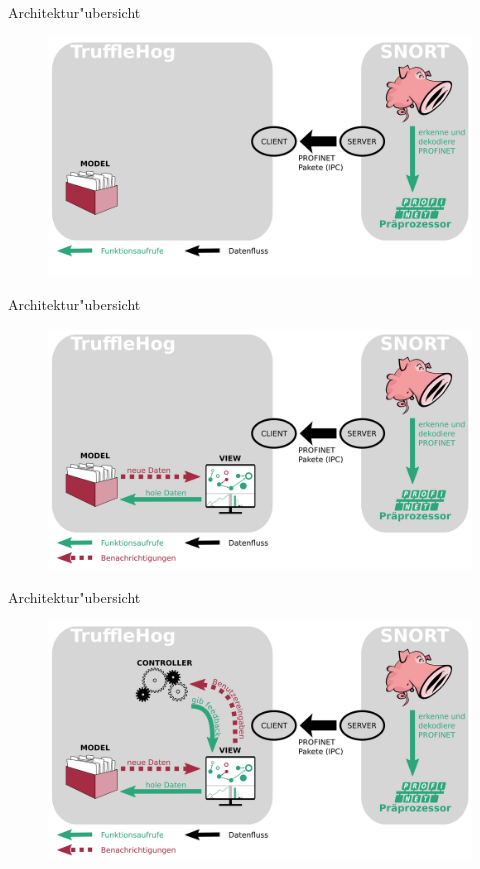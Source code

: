 \begin{frame}{Architektur"ubersicht}
	\begin{figure}
		\centering
		\includegraphics[width=\textwidth]{./images/jan_7.png}
	\end{figure}
\end{frame}


\begin{frame}{Architektur"ubersicht}
	\begin{figure}
		\centering
		\includegraphics[width=\textwidth]{./images/jan_9.png}
	\end{figure}
\end{frame}

\begin{frame}{Architektur"ubersicht}
	\begin{figure}
		\centering
		\includegraphics[width=\textwidth]{./images/jan_11.png}
	\end{figure}
\end{frame}

